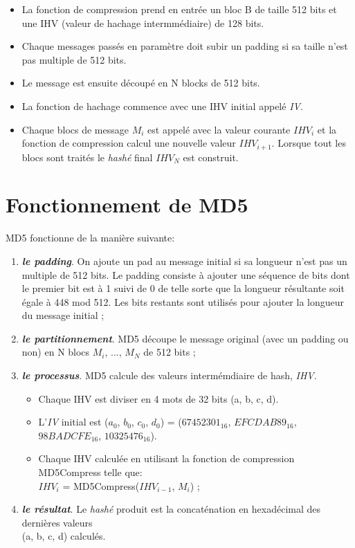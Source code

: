 \documentclass[a4paper,11pt,french]{article}
\begin{document}
\vspace{.5cm}

\begin{itemize}
\item La fonction de compression prend en entrée un bloc B de taille 512 bits et une IHV (valeur de hachage intermmédiaire) de 128 bits.
\item Chaque messages passés en paramètre doit subir un padding si sa taille n'est pas multiple de 512 bits.
\item Le message est ensuite découpé en N blocks de 512 bits.
\item La fonction de hachage commence avec une IHV initial appelé {\it{IV}}.
\item Chaque blocs de message $M_{i}$ est appelé avec la valeur courante $IHV_{i}$ et la fonction de compression calcul une nouvelle valeur $IHV_{i+1}$. Lorsque tout les blocs sont traités le {\it{hashé}} final $IHV_{N}$ est construit.
\end{itemize}
\vspace{.5cm}

\section{Fonctionnement de MD5}
MD5 fonctionne de la manière suivante:\\
\begin{enumerate}
\item {\it{\bf{le padding}}}. On ajoute un pad au message initial si sa longueur n'est pas un multiple de 512 bits. Le padding consiste à ajouter une séquence de bits dont le premier bit est à 1 suivi de 0 de telle sorte que la longueur résultante soit égale à 448 mod 512. Les bits restants sont utilisés pour ajouter la longueur du message initial ;
\item {\it{\bf{le partitionnement}}}. MD5 découpe le message original (avec un padding ou non) en N blocs $M_{i}$, ..., $M_{N}$ de 512 bits ;
\item {\it{\bf{le processus}}}. MD5 calcule des valeurs intermémdiaire de hash, {\it{IHV}}.
  \begin{itemize}
  \item Chaque IHV est diviser en 4 mots de 32 bits (a, b, c, d).
  \item L'{\it{IV}} initial est ($a_{0}$, $b_{0}$, $c_{0}$, $d_{0}$) = ($67452301_{16}$, $EFCDAB89_{16}$, $98BADCFE_{16}$, $10325476_{16}$).
  \item Chaque IHV calculée en utilisant la fonction de compression MD5Compress telle que:\\ $IHV_{i}$ = MD5Compress($IHV_{i-1}$, $M_{i}$) ;
  \end{itemize}
\item {\it{\bf{le résultat}}}. Le {\it{hashé}} produit est la concaténation en hexadécimal des dernières valeurs\\ (a, b, c, d) calculés.
\end{enumerate}
\end{document}

